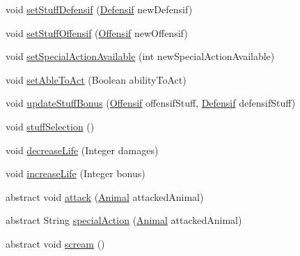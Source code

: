 \begin{DoxyCompactItemize}
\item 
void \hyperlink{classanimal_package_1_1_animal_a61b020e943b6544d7cfd09567b71cc05}{set\+Stuff\+Defensif} (\hyperlink{classstuff_1_1_defensif}{Defensif} new\+Defensif)
\item 
void \hyperlink{classanimal_package_1_1_animal_a2c9f8879ef858efb4fa766be497988ff}{set\+Stuff\+Offensif} (\hyperlink{classstuff_1_1_offensif}{Offensif} new\+Offensif)
\item 
void \hyperlink{classanimal_package_1_1_animal_a5f8d2a4181775e4c84fb940bdacf67f3}{set\+Special\+Action\+Available} (int new\+Special\+Action\+Available)
\item 
void \hyperlink{classanimal_package_1_1_animal_af5c1879fb974e72285ecac02b1de6597}{set\+Able\+To\+Act} (Boolean ability\+To\+Act)
\item 
void \hyperlink{classanimal_package_1_1_animal_a65ededb15326a1a3c5a72d7f36e578a8}{update\+Stuff\+Bonus} (\hyperlink{classstuff_1_1_offensif}{Offensif} offensif\+Stuff, \hyperlink{classstuff_1_1_defensif}{Defensif} defensif\+Stuff)
\item 
void \hyperlink{classanimal_package_1_1_animal_a0f0b758f238fb43b50a5945359a56d77}{stuff\+Selection} ()
\item 
void \hyperlink{classanimal_package_1_1_animal_a65d6de36e2e65527b8899d56ebd77f0e}{decrease\+Life} (Integer damages)
\item 
void \hyperlink{classanimal_package_1_1_animal_ae9642b7def3eee053a283e4031240f68}{increase\+Life} (Integer bonus)
\item 
abstract void \hyperlink{classanimal_package_1_1_animal_af3cba289a75f03d682536ffd4b04a8b2}{attack} (\hyperlink{classanimal_package_1_1_animal}{Animal} attacked\+Animal)
\item 
abstract String \hyperlink{classanimal_package_1_1_animal_a3ac06c6e9e88b21bbb95c569ab8a04ed}{special\+Action} (\hyperlink{classanimal_package_1_1_animal}{Animal} attacked\+Animal)
\item 
abstract void \hyperlink{classanimal_package_1_1_animal_ab16f87dcb04454d47c92c33756664839}{scream} ()
\end{DoxyCompactItemize}
